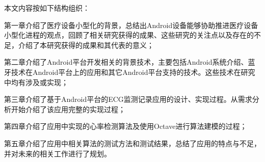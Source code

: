 本文内容按如下结构组织：

第一章介绍了医疗设备小型化的背景，总结出Android设备能够协助推进医疗设备小型化进程的观点，回顾了相关研究获得的成果、这些研究的关注点以及存在的不足，介绍了本研究获得的成果和其代表的意义；

第二章介绍了Android平台开发相关的背景技术，主要包括Android系统介绍、蓝牙技术在Android平台上的应用和其它Android平台支持的技术。这些技术在研究中均有涉及或实现；

第三章介绍了基于Android平台的ECG监测记录应用的设计、实现过程。从需求分析开始介绍了该应用完整的实现过程；

第四章介绍了应用中实现的心率检测算法及使用Octave进行算法建模的过程； 

第五章介绍了应用中相关算法的测试方法和测试结果，总结了应用的特点与不足，并对未来的相关工作进行了规划。

